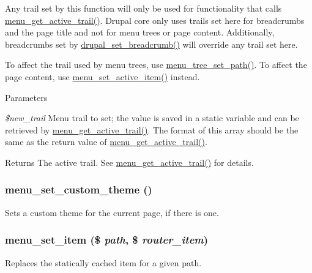 Any trail set by this function will only be used for functionality that calls \hyperlink{group__menu_ga55105d602c5c5ea5b39aae25aa47f8c5}{menu\_\-get\_\-active\_\-trail()}. Drupal core only uses trails set here for breadcrumbs and the page title and not for menu trees or page content. Additionally, breadcrumbs set by \hyperlink{common_8inc_a666113d06fa6ea461aff580e5c511eb0}{drupal\_\-set\_\-breadcrumb()} will override any trail set here.

To affect the trail used by menu trees, use \hyperlink{group__menu_gacbb655f92275e3c823637edbd9441cdd}{menu\_\-tree\_\-set\_\-path()}. To affect the page content, use \hyperlink{group__menu_gacdd22102c2ba6545645ae34be563d1d4}{menu\_\-set\_\-active\_\-item()} instead.


\begin{DoxyParams}{Parameters}
\item[{\em \$new\_\-trail}]Menu trail to set; the value is saved in a static variable and can be retrieved by \hyperlink{group__menu_ga55105d602c5c5ea5b39aae25aa47f8c5}{menu\_\-get\_\-active\_\-trail()}. The format of this array should be the same as the return value of \hyperlink{group__menu_ga55105d602c5c5ea5b39aae25aa47f8c5}{menu\_\-get\_\-active\_\-trail()}.\end{DoxyParams}
\begin{DoxyReturn}{Returns}
The active trail. See \hyperlink{group__menu_ga55105d602c5c5ea5b39aae25aa47f8c5}{menu\_\-get\_\-active\_\-trail()} for details. 
\end{DoxyReturn}
\hypertarget{group__menu_ga2545be84d84b98f84857bea11f7961fb}{
\subsubsection[{menu\_\-set\_\-custom\_\-theme}]{\setlength{\rightskip}{0pt plus 5cm}menu\_\-set\_\-custom\_\-theme ()}}
\label{group__menu_ga2545be84d84b98f84857bea11f7961fb}
Sets a custom theme for the current page, if there is one. \hypertarget{group__menu_ga731543157fbe59176d20af2282df5f75}{
\subsubsection[{menu\_\-set\_\-item}]{\setlength{\rightskip}{0pt plus 5cm}menu\_\-set\_\-item (\$ {\em path}, \/  \$ {\em router\_\-item})}}
\label{group__menu_ga731543157fbe59176d20af2282df5f75}
Replaces the statically cached item for a given path.


